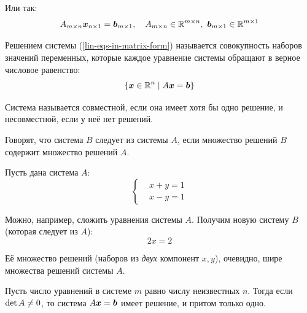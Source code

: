 \documentclass[a4paper,12pt]{article}
\begin{document}
  Или так:
  \begin{equation}\label{lin-eqs-in-matrix-form}
    A_{m \times n} \bds x_{n \times 1} = \bds b_{m \times 1},\quad A_{m \times n} \hm\in \RR^{m \times n},\ \bds b_{m \times 1} \in \RR^{m \times 1}
  \end{equation}
  
  \begin{definition}
    Решением системы (\ref{lin-eqs-in-matrix-form}) называется совокупность наборов значений переменных, которые каждое уравнение системы обращают в верное числовое равенство:
    \[
      \{\boldsymbol x \in \operatorname{\mathbb R}^n \mid A \boldsymbol x = \boldsymbol b\}
    \]
  \end{definition}
  
  \begin{definition}
    Система называется совместной, если она имеет хотя бы одно решение, и несовместной, если у неё нет решений.
  \end{definition}
  
  \begin{definition}
    Говорят, что система $B$ следует из системы $A$, если множество решений $B$ содержит множество решений $A$.
  \end{definition}
  
  \begin{example}
    Пусть дана система $A$:
    \[
      \left\{
        \begin{aligned}
          &x + y = 1\\
          &x - y = 1
        \end{aligned}
      \right.
    \]
    
    Можно, например, сложить уравнения системы $A$.
    Получим новую систему $B$ (которая следует из $A$):
    \[
      2x = 2
    \]
    
    Её множество решений (наборов из \emph{двух} компонент $x, y$), очевидно, шире множества решений системы $A$.
  \end{example}
  
 
  
  \begin{theorem}
    Пусть число уравнений в системе $m$ равно числу неизвестных $n$.
    Тогда если $\det A \hm{\not=} 0$, то система $A \bds x \hm= \bds b$ имеет решение, и притом только одно.
  \end{theorem}
  
\end{document}
